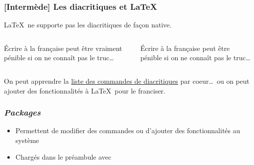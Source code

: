 
\begin{frame}[c,fragile]

	\frametitle{[Intermède] Les diacritiques et \LaTeX}
	
	\LaTeX\ ne supporte pas les diacritiques de façon native.
	
	\begin{columns}
		\vspace{-1.4em}
	\begin{codesource}
	\'{E}crire \`{a} la fran\c{c}aise 
	peut \^{e}tre vraiment p\'{e}nible 
	si on ne conna\^{i}t pas le truc\dots
	\end{codesource}
		Écrire à la française peut être pénible si on ne connaît pas le truc\dots
	\end{columns}

	On peut apprendre la \href{https://en.wikibooks.org/wiki/LaTeX/Special_Characters#Escaped_codes}%
	{liste des commandes de diacritiques} par coeur\dots\ ou on peut
	ajouter des fonctionnalités à \LaTeX\ pour le franciser.
\end{frame}


\begin{frame}[c,fragile]

	\frametitle{\emph{Packages}}
	
	\begin{itemize}
		\item Permettent de modifier des commandes ou d’ajouter des	fonctionnalités au système
		\item Chargés dans le préambule avec
		
	\begin{codesource}
	\usepackage{package}
	\usepackage[options]{package}
	\usepackage{package1,package2,...}
	\end{codesource}
	\end{itemize}
\end{frame}


